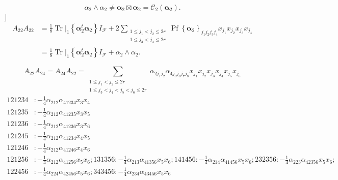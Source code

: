 \documentclass[aps, preprint]{revtex4}
\begin{document}
\begin{equation}\alpha _{2} \wedge \alpha _{2} \neq \mathbf{\alpha }_{2} \boxtimes \mathbf{\alpha }_{2} =\mathcal{C}_{2} \left (\mathbf{\alpha }_{2}\right )\text{.}
\end{equation}$\rfloor $
\begin{align}A_{2 2} A_{2 2} &  =\frac{1}{8} \left .\ensuremath{\operatorname*{Tr}}\right \vert _{1} \left \{\mathbf{\alpha }_{2}^{t} \mathbf{\alpha }_{2}\right \} I_{\mathcal{F}} +2 \sum _{\begin{array}{c}1 \leq j_{1} <j_{2} \leq 2 r \\
1 \leq j_{3} <j_{4} \leq 2 r\end{array}}\ensuremath{\operatorname*{Pf}}\left \{\mathbf{\alpha }_{2}\right \}_{j_{1} j_{2} j_{3} j_{4}} x_{j_{1}} x_{j_{2}} x_{j_{3}} x_{j_{4}} \\
 &  =\frac{1}{8} \left .\ensuremath{\operatorname*{Tr}}\right \vert _{1} \left \{\mathbf{\alpha }_{2}^{t} \mathbf{\alpha }_{2}\right \} I_{\mathcal{F}} +\alpha _{2} \wedge \alpha _{2}\text{.}\end{align}

\bigskip \begin{equation}A_{2 2} A_{2 4} =A_{2 4} A_{2 2} =\sum _{\begin{array}{c}1 \leq j_{1} <j_{2} \leq 2 r \\
1 \leq j_{3} <j_{4} <j_{5} <j_{6} \leq 2 r\end{array}}\alpha _{2 j_{1} j_{2}} \alpha _{4 j_{5} j_{6} j_{7} j_{8}} x_{j_{1}} x_{j_{2}} x_{j_{3}} x_{j_{4}} x_{j_{5}} x_{j_{6}}
\end{equation}
\begin{align}121234 &  : -\frac{1}{4} \alpha _{2 1 2} \alpha _{4 1 2 3 4} x_{3} x_{4} \\
121235 &  : -\frac{1}{4} \alpha _{2 1 2} \alpha _{4 1 2 3 5} x_{3} x_{5} \\
121236 &  : -\frac{1}{4} \alpha _{2 1 2} \alpha _{4 1 2 3 6} x_{3} x_{6} \\
121245 &  : -\frac{1}{4} \alpha _{2 1 2} \alpha _{4 1 2 3 4} x_{4} x_{5} \\
121246 &  : -\frac{1}{4} \alpha _{2 1 2} \alpha _{4 1 2 4 6} x_{4} x_{6} \\
121256 &  : -\frac{1}{4} \alpha _{2 1 2} \alpha _{4 1 2 5 6} x_{5} x_{6} ;131356 : -\frac{1}{4} \alpha _{2 1 3} \alpha _{4 1 3 5 6} x_{5} x_{6} ;141456 : -\frac{1}{4} \alpha _{2 1 4} \alpha _{4 1 4 5 6} x_{5} x_{6} ;232356 : -\frac{1}{4} \alpha _{2 2 3} \alpha _{4 2 3 5 6} x_{5} x_{6} ; \\
122456 &  : -\frac{1}{4} \alpha _{2 2 4} \alpha _{4 2 4 5 6} x_{5} x_{6} ;343456 : -\frac{1}{4} \alpha _{2 3 4} \alpha _{4 3 4 5 6} x_{5} x_{6}\end{align}
\end{document}
